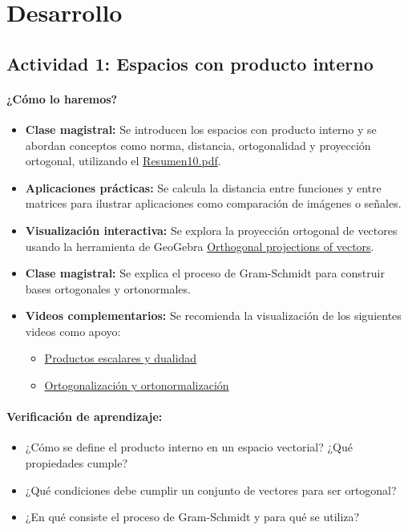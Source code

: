 \documentclass[a4,11pt]{aleph-notas}
\begin{document}
\section*{Desarrollo}

\subsection*{Actividad 1: Espacios con producto interno}

\paragraph{¿Cómo lo haremos?}  
\begin{itemize}[leftmargin=*]
    \item \textbf{Clase magistral:} Se introducen los espacios con producto interno y se abordan conceptos como norma, distancia, ortogonalidad y proyección ortogonal, utilizando el \href{https://fcena-puce.github.io/AlgLinealyGeomAnalitica-05-N0068/2-Resumenes/Resumen10.pdf}{Resumen10.pdf}.
    \item \textbf{Aplicaciones prácticas:} Se calcula la distancia entre funciones y entre matrices para ilustrar aplicaciones como comparación de imágenes o señales.
    \item \textbf{Visualización interactiva:} Se explora la proyección ortogonal de vectores usando la herramienta de GeoGebra \href{https://www.geogebra.org/m/b5c9x8ef}{Orthogonal projections of vectors}.
    \item \textbf{Clase magistral:} Se explica el proceso de Gram-Schmidt para construir bases ortogonales y ortonormales.
    \item \textbf{Videos complementarios:} Se recomienda la visualización de los siguientes videos como apoyo:
    \begin{itemize}
        \item \href{https://youtu.be/LyGKycYT2v0?si=AitPzM6HonO3Zltf}{Productos escalares y dualidad}
        \item \href{https://youtu.be/7oO6xXpaTLk?si=2qbLr_N9Z2RR2iE9}{Ortogonalización y ortonormalización}
    \end{itemize}
\end{itemize}

\paragraph{Verificación de aprendizaje:}  
\begin{itemize}[leftmargin=*]
    \item ¿Cómo se define el producto interno en un espacio vectorial? ¿Qué propiedades cumple?
    \item ¿Qué condiciones debe cumplir un conjunto de vectores para ser ortogonal?
    \item ¿En qué consiste el proceso de Gram-Schmidt y para qué se utiliza?
\end{itemize}
\end{document}
